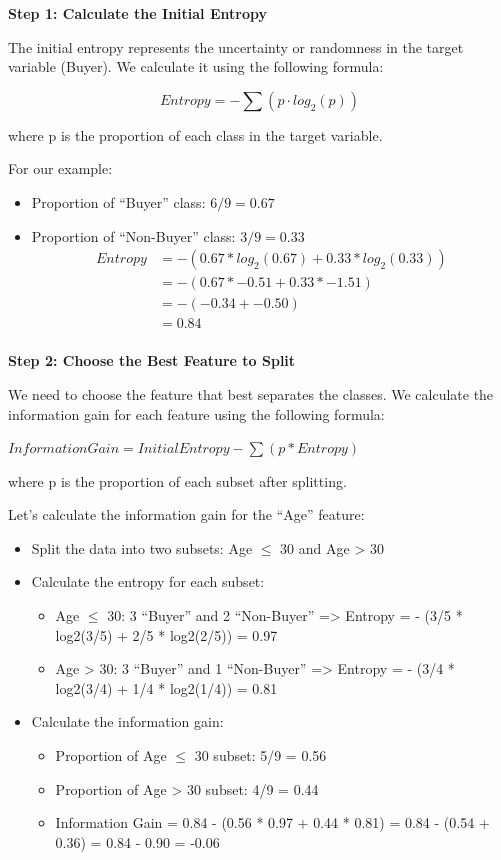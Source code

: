 \documentclass[12pt]{book}
\providecommand{\tightlist}{%
  \setlength{\itemsep}{0pt}\setlength{\parskip}{0pt}}
\begin{document}
\textbf{Step 1: Calculate the Initial Entropy}

The initial entropy represents the uncertainty or randomness in the
target variable (Buyer). We calculate it using the following formula:

\[
Entropy = - \sum (p \cdot log_2(p))
\]

where p is the proportion of each class in the target variable.

For our example:

\begin{itemize}
\tightlist
\item
  Proportion of ``Buyer'' class: \(6/9 = 0.67\)
\item
  Proportion of ``Non-Buyer'' class: \(3/9 = 0.33\) \[
  \begin{split}
  Entropy & = - (0.67 * log_2(0.67) + 0.33 * log_2(0.33)) \\
  & = - (0.67 * -0.51 + 0.33 * -1.51) \\
  & = - (-0.34 + -0.50) \\
  & = 0.84 \\
  \end{split}
  \]
\end{itemize}

\textbf{Step 2: Choose the Best Feature to Split}

We need to choose the feature that best separates the classes. We
calculate the information gain for each feature using the following
formula:

\(Information Gain = Initial Entropy - \sum (p * Entropy)\)

where p is the proportion of each subset after splitting.

Let's calculate the information gain for the ``Age'' feature:

\begin{itemize}
\tightlist
\item
  Split the data into two subsets: Age \(\le\) 30 and Age \textgreater{} 30
\item
  Calculate the entropy for each subset:

  \begin{itemize}
  \tightlist
  \item
    Age \(\le \) 30: 3 ``Buyer'' and 2 ``Non-Buyer'' =\textgreater{} Entropy =
    - (3/5 * log2(3/5) + 2/5 * log2(2/5)) = 0.97
  \item
    Age \textgreater{} 30: 3 ``Buyer'' and 1 ``Non-Buyer''
    =\textgreater{} Entropy = - (3/4 * log2(3/4) + 1/4 * log2(1/4)) =
    0.81
  \end{itemize}
\item
  Calculate the information gain:

  \begin{itemize}
  \tightlist
  \item
    Proportion of Age \(\le\) 30 subset: 5/9 = 0.56
  \item
    Proportion of Age \textgreater{} 30 subset: 4/9 = 0.44
  \item
    Information Gain = 0.84 - (0.56 * 0.97 + 0.44 * 0.81) = 0.84 - (0.54
    + 0.36) = 0.84 - 0.90 = -0.06
  \end{itemize}
\end{itemize}
\end{document}
